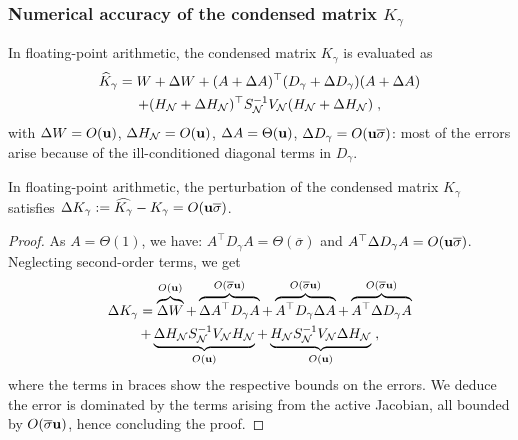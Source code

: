 \subsubsection{Numerical accuracy of the condensed matrix $K_\gamma$}
In floating-point arithmetic, the condensed matrix $K_\gamma$ is evaluated as
\begin{multline*}
  \widehat{K}_\gamma = W + \Delta W + (A + \Delta A)^\top (D_\gamma + \Delta D_\gamma) (A + \Delta A) \\
  + (H_{\mathcal{N}} + \Delta H_{\mathcal{N}})^\top S_{\mathcal{N}}^{-1} V_{\mathcal{N}} (H_{\mathcal{N}} + \Delta H_{\mathcal{N}}) \; ,
\end{multline*}
with $\Delta W = O(\mathbf{u})$, $\Delta H_{\mathcal{N}}  = O(\mathbf{u})$, $ \Delta A  = \Theta(\mathbf{u})$,
$\Delta D_\gamma = O(\mathbf{u} \overline{\sigma})$: most
of the errors arise because of the ill-conditioned diagonal terms in $D_\gamma$.
\begin{proposition}
  \label{prop:cond:boundcondensedmatrix}
  In floating-point arithmetic, the perturbation
  of the condensed matrix $K_\gamma$ satisfies
  $\Delta K_\gamma := \widehat{K_\gamma} - K_\gamma  = O(\mathbf{u} \overline{\sigma})$.
\end{proposition}
\begin{proof}
  As $A = \Theta(1)$, we have:
 $A^\top D_\gamma A = \Theta(\overline{\sigma})$ and
  $A^\top \Delta D_\gamma A = O(\mathbf{u} \overline{\sigma})$.
  Neglecting second-order terms, we get
  \begin{multline*}
    \Delta K_\gamma =
    \overbrace{\Delta W}^{O(\mathbf{u})}
    + \overbrace{\Delta A^\top D_\gamma A}^{O(\overline{\sigma}\mathbf{u})}
    + \overbrace{A^\top D_\gamma \Delta A}^{O(\overline{\sigma}\mathbf{u})}
    + \overbrace{A^\top \Delta D_\gamma A}^{O(\overline{\sigma}\mathbf{u})}  \\
    + \underbrace{\Delta H_{\mathcal{N}} S_{\mathcal{N}}^{-1} V_{\mathcal{N}} H_{\mathcal{N}}}_{O(\mathbf{u})}
    + \underbrace{H_{\mathcal{N}} S_{\mathcal{N}}^{-1} V_{\mathcal{N}} \Delta H_{\mathcal{N}} }_{O(\mathbf{u})}
      \; ,
  \end{multline*}
  where the terms in braces show the respective bounds on the errors.
  We deduce the error is dominated by the terms arising from the active Jacobian,
  all bounded by $O(\overline{\sigma} \mathbf{u})$, hence concluding the proof.
\end{proof}

